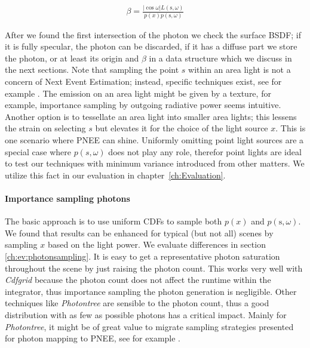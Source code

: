 \begin{align}\label{eq:beta}
\beta = \frac{|\cos{\omega}|L(\text{s}, \omega)}{p(x)p(\text{s}, \omega)}
\end{align}

 After we found the first intersection of the photon we check the surface BSDF; if it is fully specular, the photon can be discarded, if it has a diffuse part we store the photon, or at least its origin and $\beta$ in a data structure which we discuss in the next sections. Note that sampling the point $s$ within an area light is not a concern of Next Event Estimation; instead, specific techniques exist, see for example \parencite{Shirley:1996:MCT:226150.226151, DBLP:journals/cgf/UrenaFK13, DBLP:journals/corr/abs-1805-09048, DBLP:journals/cgf/KokJ92}. The emission on an area light might be given by a texture, for example, importance sampling by outgoing radiative power seems intuitive. Another option is to tessellate an area light into smaller area lights; this lessens the strain on selecting $s$ but elevates it for the choice of the light source $x$. This is one scenario where PNEE can shine. Uniformly omitting point light sources are a special case where $p(s,\omega)$ does not play any role, therefor point lights are ideal to test our techniques with minimum variance introduced from other matters. We utilize this fact in our evaluation in chapter~\ref{ch:Evaluation}.

\paragraph{Importance sampling photons}
\label{ch:photonimportancesample}

The basic approach is to use uniform CDFs to sample both $p(x)$ and $p(\text{s}, \omega)$. We found that results can be enhanced for typical (but not all) scenes by sampling $x$ based on the light power. We evaluate differences in section \ref{ch:ev:photonsampling}. It is easy to get a representative photon saturation throughout the scene by just raising the photon count. This works very well with \textit{Cdfgrid} because the photon count does not affect the runtime within the integrator, thus importance sampling the photon generation is negligible. Other techniques like \textit{Photontree} are sensible to the photon count, thus a good distribution with as few as possible photons has a critical impact. Mainly for \textit{Photontree}, it might be of great value to migrate sampling strategies presented for photon mapping to PNEE, see for example \parencite{DBLP:conf/rt/PeterP98, DBLP:conf/rt/SuykensW00, DBLP:journals/vc/ZhengZ15}.

